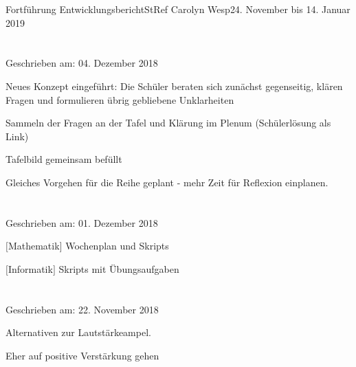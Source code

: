 \documentclass[oneside,openany,headings=optiontotoc,11pt,numbers=noenddot]{article}
\begin{document}
\begin{worksheet}{Fortführung Entwicklungsbericht}{StRef\grq{} Carolyn Wesp}{24. November bis 14. Januar 2019}
		\section*{}
		\tiny{Geschrieben am: 04. Dezember 2018}\small\\
		\par\noindent
		Neues Konzept eingeführt: Die Schüler beraten sich zunächst gegenseitig, klären Fragen und formulieren übrig gebliebene Unklarheiten\\
		\par\noindent
		Sammeln der Fragen an der Tafel und Klärung im Plenum (Schülerlösung als Link)\\
		\par\noindent		
		Tafelbild gemeinsam befüllt\\
		\par\noindent		
		Gleiches Vorgehen für die Reihe geplant - mehr Zeit für Reflexion einplanen.\\
		
		\section*{}
		\tiny{Geschrieben am: 01. Dezember 2018}\small\\
		\par\noindent
		$\lbrack$Mathematik$\rbrack$ Wochenplan und Skripts\\
		\par\noindent		
		$\lbrack$Informatik$\rbrack$ Skripts mit Übungsaufgaben\\
		
		\section*{}
		\tiny{Geschrieben am: 22. November 2018}\small\\
		\par\noindent
		Alternativen zur Lautstärkeampel.\\
		\par\noindent		
		Eher auf positive Verstärkung gehen\\
		

\end{worksheet}
\end{document}
